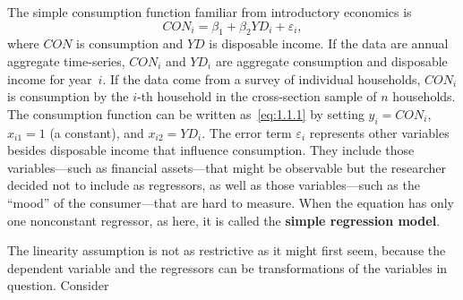 \begin{example}
\label{ex:consumption}
The simple consumption function familiar from introductory economics is
\begin{equation}
  CON_i = \beta_1 + \beta_2 YD_i + \varepsilon_i,
  \label{eq:1.1.2}
\end{equation}
where $CON$ is consumption and $YD$ is disposable income.  If the data are annual
aggregate time-series, $CON_i$ and $YD_i$ are aggregate consumption and disposable income
for year~$i$.  If the data come from a survey of individual households, $CON_i$ is
consumption by the $i$-th household in the cross-section sample of $n$ households.  The
consumption function can be written as~\eqref{eq:1.1.1} by setting $y_i = CON_i$,
$x_{i1} = 1$ (a constant), and $x_{i2} = YD_i$.  The error term $\varepsilon_i$
represents other variables besides disposable income that influence consumption.  They
include those variables---such as financial assets---that might be observable but the
researcher decided not to include as regressors, as well as those variables---such as the
``mood'' of the consumer---that are hard to measure.  When the equation has only one
nonconstant regressor, as here, it is called the \textbf{simple regression model}.
\end{example}

The linearity assumption is not as restrictive as it might first seem, because the
dependent variable and the regressors can be transformations of the variables in question.
Consider

